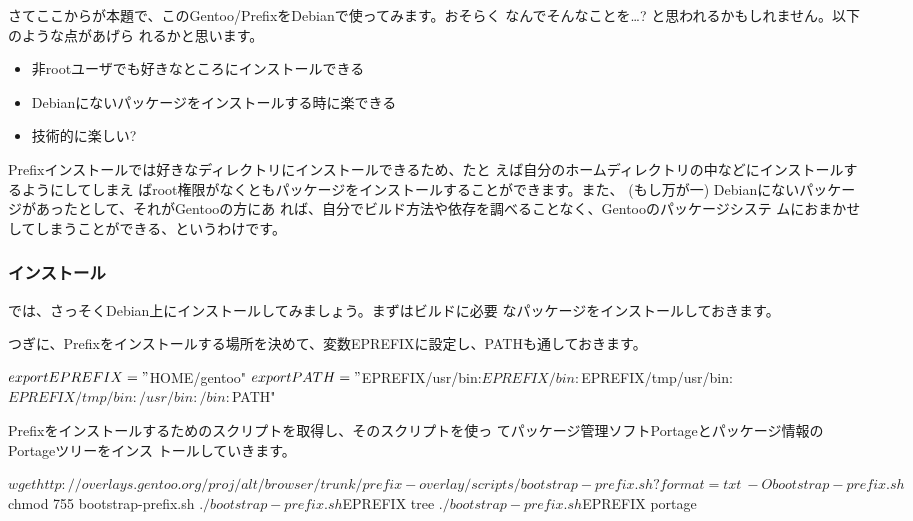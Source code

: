 \documentclass[mingoth,a4paper]{jsarticle}
\begin{document}
さてここからが本題で、このGentoo/PrefixをDebianで使ってみます。おそらく
なんでそんなことを…? と思われるかもしれません。以下のような点があげら
れるかと思います。

\begin{itemize}
\item 非rootユーザでも好きなところにインストールできる
\item Debianにないパッケージをインストールする時に楽できる
\item 技術的に楽しい?
\end{itemize}

Prefixインストールでは好きなディレクトリにインストールできるため、たと
えば自分のホームディレクトリの中などにインストールするようにしてしまえ
ばroot権限がなくともパッケージをインストールすることができます。また、
(もし万が一) Debianにないパッケージがあったとして、それがGentooの方にあ
れば、自分でビルド方法や依存を調べることなく、Gentooのパッケージシステ
ムにおまかせしてしまうことができる、というわけです。

\subsubsection{インストール}

では、さっそくDebian上にインストールしてみましょう。まずはビルドに必要
なパッケージをインストールしておきます。


つぎに、Prefixをインストールする場所を決めて、変数EPREFIXに設定し、PATHも通しておきます。

\begin{commandline}
$ export EPREFIX="$HOME/gentoo"
$ export PATH="$EPREFIX/usr/bin:$EPREFIX/bin:$EPREFIX/tmp/usr/bin:$EPREFIX/tmp/bin:/usr/bin:/bin:$PATH"
\end{commandline}

Prefixをインストールするためのスクリプトを取得し、そのスクリプトを使っ
てパッケージ管理ソフトPortageとパッケージ情報のPortageツリーをインス
トールしていきます。

\begin{commandline}
$ wget http://overlays.gentoo.org/proj/alt/browser/trunk/prefix-overlay/scripts/bootstrap-prefix.sh?format=txt \
  -O bootstrap-prefix.sh
$ chmod 755 bootstrap-prefix.sh
$ ./bootstrap-prefix.sh $EPREFIX tree
$ ./bootstrap-prefix.sh $EPREFIX portage
\end{commandline}
\end{document}
